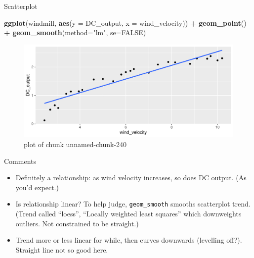 \documentclass[
  ignorenonframetext,
]{beamer}
\newenvironment{Shaded}{\begin{snugshade}}{\end{snugshade}}
\newcommand{\DataTypeTok}[1]{\textcolor[rgb]{0.13,0.29,0.53}{#1}}
\newcommand{\KeywordTok}[1]{\textcolor[rgb]{0.13,0.29,0.53}{\textbf{#1}}}
\newcommand{\NormalTok}[1]{#1}
\newcommand{\OperatorTok}[1]{\textcolor[rgb]{0.81,0.36,0.00}{\textbf{#1}}}
\newcommand{\OtherTok}[1]{\textcolor[rgb]{0.56,0.35,0.01}{#1}}
\newcommand{\StringTok}[1]{\textcolor[rgb]{0.31,0.60,0.02}{#1}}
\providecommand{\tightlist}{%
  \setlength{\itemsep}{0pt}\setlength{\parskip}{0pt}}
\begin{document}
\begin{frame}[fragile]{Scatterplot}
\protect\hypertarget{scatterplot}{}

\begin{Shaded}
\begin{Highlighting}[]
\KeywordTok{ggplot}\NormalTok{(windmill, }\KeywordTok{aes}\NormalTok{(}\DataTypeTok{y =}\NormalTok{ DC_output, }\DataTypeTok{x =}\NormalTok{ wind_velocity)) }\OperatorTok{+}
\StringTok{  }\KeywordTok{geom_point}\NormalTok{() }\OperatorTok{+}\StringTok{ }\KeywordTok{geom_smooth}\NormalTok{(}\DataTypeTok{method=}\StringTok{"lm"}\NormalTok{, }\DataTypeTok{se=}\OtherTok{FALSE}\NormalTok{)}
\end{Highlighting}
\end{Shaded}

\begin{figure}
\centering
\includegraphics{figure/unnamed-chunk-240-1.pdf}
\caption{plot of chunk unnamed-chunk-240}
\end{figure}

\end{frame}

\begin{frame}[fragile]{Comments}
\protect\hypertarget{comments-12}{}

\begin{itemize}
\tightlist
\item
  Definitely a relationship: as wind velocity increases, so does DC
  output. (As you'd expect.)
\item
  Is relationship linear? To help judge, \texttt{geom\_smooth} smooths
  scatterplot trend. (Trend called ``loess'', ``Locally weighted least
  squares'' which downweights outliers. Not constrained to be straight.)
\item
  Trend more or less linear for while, then curves downwards (levelling
  off?). Straight line not so good here.
\end{itemize}

\end{frame}
\end{document}
